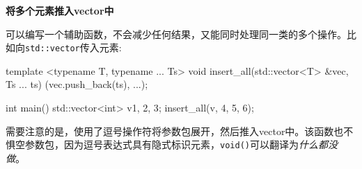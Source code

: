 \textbf{将多个元素推入vector中}

可以编写一个辅助函数，不会减少任何结果，又能同时处理同一类的多个操作。比如向\texttt{std::vector}传入元素:

\begin{codebox}[cpp]
template <typename T, typename ... Ts>
void insert_all(std::vector<T> &vec, Ts ... ts){
    (vec.push_back(ts), ...);
}

int main(){
    std::vector<int> v{1, 2, 3};
    insert_all(v, 4, 5, 6);
}
\end{codebox}

需要注意的是，使用了逗号操作符将参数包展开，然后推入vector中。该函数也不惧空参数包，因为逗号表达式具有隐式标识元素，\texttt{void()}可以翻译为\emph{什么都没做}。


